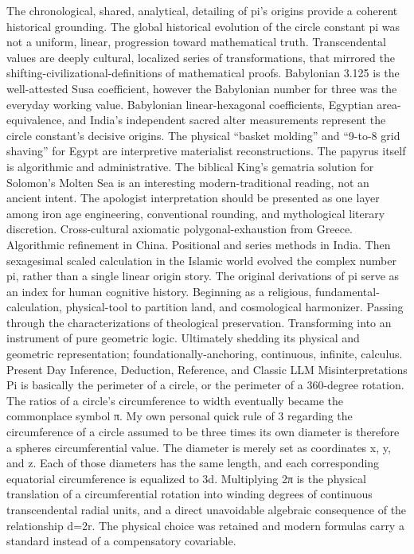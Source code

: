 {The chronological, shared, analytical, detailing of pi’s origins provide a coherent historical grounding. The global historical evolution of the circle constant pi was not a uniform, linear, progression toward mathematical truth. Transcendental values are deeply cultural, localized series of transformations, that mirrored the shifting-civilizational-definitions of mathematical proofs. Babylonian 3.125 is the well-attested Susa coefficient, however the Babylonian number for three was the everyday working value. Babylonian linear-hexagonal coefficients, Egyptian area-equivalence, and India’s independent sacred alter measurements represent the circle constant’s decisive origins. The physical “basket molding” and “9-to-8 grid shaving” for Egypt are interpretive materialist reconstructions. The papyrus itself is algorithmic and administrative. The biblical King’s gematria solution for Solomon’s Molten Sea is an interesting modern-traditional reading, not an ancient intent. The apologist interpretation should be presented as one layer among iron age engineering, conventional rounding, and mythological literary discretion. Cross-cultural axiomatic polygonal-exhaustion from Greece. Algorithmic refinement in China. Positional and series methods in India. Then sexagesimal scaled calculation in the Islamic world evolved the complex number pi, rather than a single linear origin story. 
The original derivations of pi serve as an index for human cognitive history. Beginning as a religious, fundamental-calculation, physical-tool to partition land, and cosmological harmonizer. Passing through the characterizations of theological preservation. Transforming into an instrument of pure geometric logic. Ultimately shedding its physical and geometric representation; foundationally-anchoring, continuous, infinite, calculus.
Present Day Inference, Deduction, Reference, and Classic LLM Misinterpretations
Pi is basically the perimeter of a circle, or the perimeter of a 360-degree rotation. The ratios of a circle’s circumference to width eventually became the commonplace symbol π.
My own personal quick rule of 3 regarding the circumference of a circle assumed to be three times its own diameter is therefore a spheres circumferential value.
The diameter is merely set as coordinates x, y, and z.
Each of those diameters has the same length, and each corresponding equatorial circumference is equalized to 3d.
Multiplying 2π is the physical translation of a circumferential rotation into winding degrees of continuous transcendental radial units, and a direct unavoidable algebraic consequence of the relationship d=2r.  The physical choice was retained and modern formulas carry a standard instead of a compensatory covariable.
}
